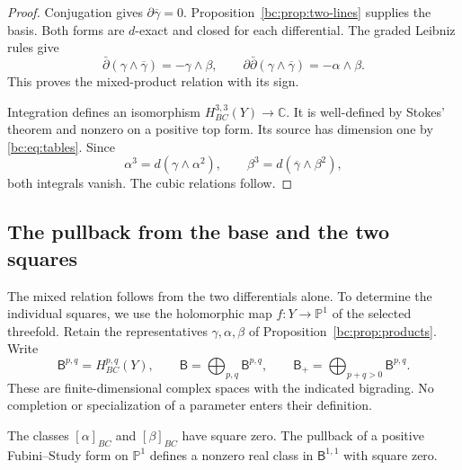 \begin{proof}
Conjugation gives $\partial\overline\gamma=0$.
Proposition~\ref{bc:prop:two-lines} supplies the basis.
Both forms are $d$-exact and closed for each differential.
The graded Leibniz rules give
\[
 \bar\partial(\gamma\wedge\overline\gamma)
       =-\gamma\wedge\beta,
 \qquad
 \partial\bar\partial(\gamma\wedge\overline\gamma)
       =-\alpha\wedge\beta.
\]
This proves the mixed-product relation with its sign.

Integration defines an isomorphism
$H_{BC}^{3,3}(Y)\to\mathbb C$.
It is well-defined by Stokes' theorem and nonzero on a positive
top form. Its source has dimension one by
\eqref{bc:eq:tables}. Since
\[
 \alpha^3=d(\gamma\wedge\alpha^2),\qquad
 \beta^3=d(\overline\gamma\wedge\beta^2),
\]
both integrals vanish. The cubic relations follow.
\end{proof}

\subsection{The pullback from the base and the two squares}

The mixed relation follows from the two differentials alone.
To determine the individual squares, we use the holomorphic map
$f:Y\to\mathbb P^1$ of the selected threefold.
Retain the representatives $\gamma,\alpha,\beta$ of
Proposition~\ref{bc:prop:products}. Write
\[
 \mathsf B^{p,q}=H_{BC}^{p,q}(Y),\qquad
 \mathsf B=\bigoplus_{p,q}\mathsf B^{p,q},\qquad
 \mathsf B_+=\bigoplus_{p+q>0}\mathsf B^{p,q}.
\]
These are finite-dimensional complex spaces with the indicated
bigrading. No completion or specialization of a parameter enters
their definition.

\begin{lemma}\label{bc:lem:squares}
The classes $[\alpha]_{BC}$ and $[\beta]_{BC}$ have square zero.
The pullback of a positive Fubini--Study form on $\mathbb P^1$
defines a nonzero real class in $\mathsf B^{1,1}$ with square zero.
\end{lemma}

